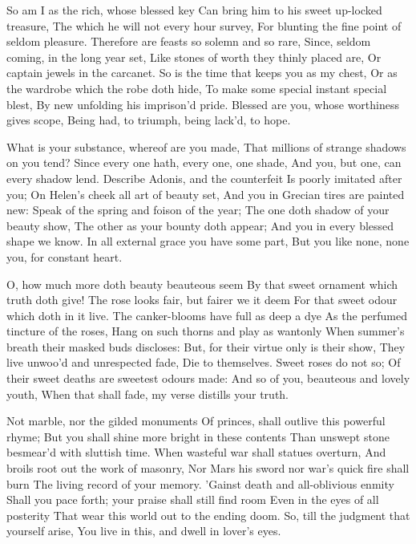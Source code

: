 \documentclass[twocolumn]{book}
\begin{document}
So am I as the rich, whose blessed key
Can bring him to his sweet up-locked treasure,
The which he will not every hour survey,
For blunting the fine point of seldom pleasure.
\numerus*{}Therefore are feasts so solemn and so rare,
Since, seldom coming, in the long year set,
Like stones of worth they thinly placed are,
Or captain jewels in the carcanet.
So is the time that keeps you as my chest,
Or as the wardrobe which the robe doth hide,
To make some special instant special blest,
By new unfolding his imprison'd pride.
  Blessed are you, whose worthiness gives scope,
  Being had, to triumph, being lack'd, to hope.


What is your substance, whereof are you made,
That millions of strange shadows on you tend?
Since every one hath, every one, one shade,
And you, but one, can every shadow lend.
Describe Adonis, and the counterfeit
Is poorly imitated after you;
On Helen's cheek all art of beauty set,
And you in Grecian tires are painted new:
Speak of the spring and foison of the year;
The one doth shadow of your beauty show,
The other as your bounty doth appear;
And you in every blessed shape we know.
  In all external grace you have some part,
  But you like none, none you, for constant heart.


O, how much more doth beauty beauteous seem
By that sweet ornament which truth doth give!
The rose looks fair, but fairer we it deem
For that sweet odour which doth in it live.
The canker-blooms have full as deep a dye
As the perfumed tincture of the roses,
Hang on such thorns and play as wantonly
When summer's breath their masked buds discloses:
But, for their virtue only is their show,
They live unwoo'd and unrespected fade,
Die to themselves. Sweet roses do not so;
Of their sweet deaths are sweetest odours made:
  And so of you, beauteous and lovely youth,
  When that shall fade, my verse distills your truth.


Not marble, nor the gilded monuments
Of princes, shall outlive this powerful rhyme;
But you shall shine more bright in these contents
Than unswept stone besmear'd with sluttish time.
When wasteful war shall statues overturn,
And broils root out the work of masonry,
Nor Mars his sword nor war's quick fire shall burn
The living record of your memory.
'Gainst death and all-oblivious enmity
Shall you pace forth; your praise shall still find room
Even in the eyes of all posterity
That wear this world out to the ending doom.
  So, till the judgment that yourself arise,
  You live in this, and dwell in lover's eyes.
\end{document}
